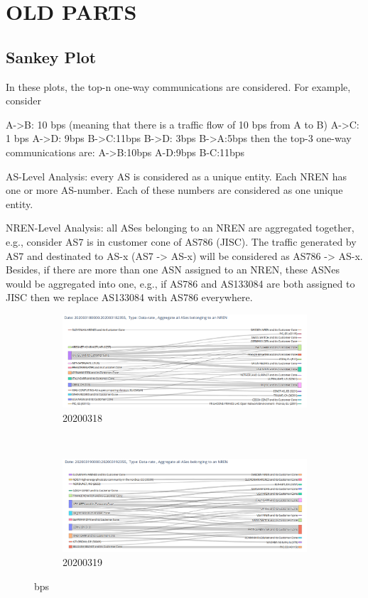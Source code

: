 \documentclass[10pt, journal, letterpaper]{IEEEtran}
\newcommand\boxFigSze{1}
\begin{document}
\section{OLD PARTS}
\subsection{Sankey Plot}
In these plots, the top-n one-way communications are considered. For example, consider

A->B: 10 bps (meaning that there is a traffic flow of 10 bps from A to B)
A->C: 1 bps
A->D: 9bps
B->C:11bps
B->D: 3bps
B->A:5bps
then the top-3 one-way communications are:
A->B:10bps
A-D:9bps
B-C:11bps

AS-Level Analysis: every AS is considered as a unique entity. Each NREN has one or more AS-number. Each of these numbers are considered as one unique entity.

NREN-Level Analysis: all ASes belonging to an NREN are aggregated together, e.g., consider AS7 is in customer cone of AS786 (JISC). The traffic generated by AS7 and destinated to AS-x (AS7 -> AS-x) will be considered as AS786 -> AS-x. Besides, if there are more than one ASN assigned to an NREN, these ASNes would be aggregated into one, e.g., if AS786 and AS133084 are both assigned to JISC then we replace AS133084 with AS786 everywhere.

\begin{figure}
    \begin{subfigure}{\boxFigSze\textwidth}
          \centering
          \includegraphics[width=\columnwidth]{img/sankey_20200318_NRENlevel_bps.png}
          \caption{20200318}
          \label{fig:top_generating_fps}
    \end{subfigure}\\
    \begin{subfigure}{\boxFigSze\textwidth}
          \centering
          \includegraphics[width=\columnwidth]{img/sankey_20200319_NRENlevel_bps.png}
          \caption{20200319}
          \label{fig:top_receiving_bps}
    \end{subfigure}
    \caption{bps}
    \label{fig:sankey_bps}
\end{figure}
\end{document}
